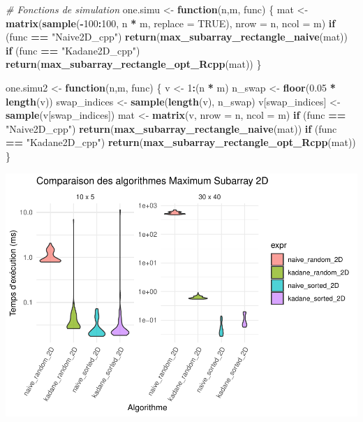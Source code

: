 \documentclass[
]{article}
\newenvironment{Shaded}{\begin{snugshade}}{\end{snugshade}}
\newcommand{\AttributeTok}[1]{\textcolor[rgb]{0.13,0.29,0.53}{#1}}
\newcommand{\CommentTok}[1]{\textcolor[rgb]{0.56,0.35,0.01}{\textit{#1}}}
\newcommand{\ConstantTok}[1]{\textcolor[rgb]{0.56,0.35,0.01}{#1}}
\newcommand{\ControlFlowTok}[1]{\textcolor[rgb]{0.13,0.29,0.53}{\textbf{#1}}}
\newcommand{\DecValTok}[1]{\textcolor[rgb]{0.00,0.00,0.81}{#1}}
\newcommand{\FloatTok}[1]{\textcolor[rgb]{0.00,0.00,0.81}{#1}}
\newcommand{\FunctionTok}[1]{\textcolor[rgb]{0.13,0.29,0.53}{\textbf{#1}}}
\newcommand{\NormalTok}[1]{#1}
\newcommand{\OtherTok}[1]{\textcolor[rgb]{0.56,0.35,0.01}{#1}}
\newcommand{\SpecialCharTok}[1]{\textcolor[rgb]{0.81,0.36,0.00}{\textbf{#1}}}
\newcommand{\StringTok}[1]{\textcolor[rgb]{0.31,0.60,0.02}{#1}}
\begin{document}
\begin{Shaded}
\begin{Highlighting}[]
\CommentTok{\# Fonctions de simulation}
\NormalTok{one.simu }\OtherTok{\textless{}{-}} \ControlFlowTok{function}\NormalTok{(n,m, func) \{}
\NormalTok{  mat }\OtherTok{\textless{}{-}} \FunctionTok{matrix}\NormalTok{(}\FunctionTok{sample}\NormalTok{(}\SpecialCharTok{{-}}\DecValTok{100}\SpecialCharTok{:}\DecValTok{100}\NormalTok{, n }\SpecialCharTok{*}\NormalTok{ m, }\AttributeTok{replace =} \ConstantTok{TRUE}\NormalTok{), }\AttributeTok{nrow =}\NormalTok{ n, }\AttributeTok{ncol =}\NormalTok{ m)}
  \ControlFlowTok{if}\NormalTok{ (func }\SpecialCharTok{==} \StringTok{"Naive2D\_cpp"}\NormalTok{) }\FunctionTok{return}\NormalTok{(}\FunctionTok{max\_subarray\_rectangle\_naive}\NormalTok{(mat))}
  \ControlFlowTok{if}\NormalTok{ (func }\SpecialCharTok{==} \StringTok{"Kadane2D\_cpp"}\NormalTok{) }\FunctionTok{return}\NormalTok{(}\FunctionTok{max\_subarray\_rectangle\_opt\_Rcpp}\NormalTok{(mat))}
\NormalTok{\}}

\NormalTok{one.simu2 }\OtherTok{\textless{}{-}} \ControlFlowTok{function}\NormalTok{(n,m, func) \{}
\NormalTok{  v }\OtherTok{\textless{}{-}} \DecValTok{1}\SpecialCharTok{:}\NormalTok{(n }\SpecialCharTok{*}\NormalTok{ m)}
\NormalTok{  n\_swap }\OtherTok{\textless{}{-}} \FunctionTok{floor}\NormalTok{(}\FloatTok{0.05} \SpecialCharTok{*} \FunctionTok{length}\NormalTok{(v))}
\NormalTok{  swap\_indices }\OtherTok{\textless{}{-}} \FunctionTok{sample}\NormalTok{(}\FunctionTok{length}\NormalTok{(v), n\_swap)}
\NormalTok{  v[swap\_indices] }\OtherTok{\textless{}{-}} \FunctionTok{sample}\NormalTok{(v[swap\_indices])}
\NormalTok{  mat }\OtherTok{\textless{}{-}} \FunctionTok{matrix}\NormalTok{(v, }\AttributeTok{nrow =}\NormalTok{ n, }\AttributeTok{ncol =}\NormalTok{ m)}
  \ControlFlowTok{if}\NormalTok{ (func }\SpecialCharTok{==} \StringTok{"Naive2D\_cpp"}\NormalTok{) }\FunctionTok{return}\NormalTok{(}\FunctionTok{max\_subarray\_rectangle\_naive}\NormalTok{(mat))}
  \ControlFlowTok{if}\NormalTok{ (func }\SpecialCharTok{==} \StringTok{"Kadane2D\_cpp"}\NormalTok{) }\FunctionTok{return}\NormalTok{(}\FunctionTok{max\_subarray\_rectangle\_opt\_Rcpp}\NormalTok{(mat))}
\NormalTok{\}}
\end{Highlighting}
\end{Shaded}

\includegraphics{MaxSubarray2D_files/figure-latex/benchmark2-1.pdf}
\end{document}
